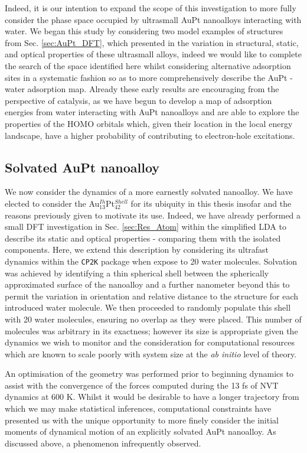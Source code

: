 Indeed, it is our intention to expand the scope of this investigation to more fully consider the phase space occupied by ultrasmall AuPt nanoalloys interacting with water. We began this study by considering two model examples of structures from Sec. \ref{sec:AuPt_DFT}, which presented in \cite{JonesAuPt} the variation in structural, static, and optical properties of these ultrasmall alloys, indeed we would like to complete the search of the space identified here whilst considering alternative adsorption sites in a systematic fashion so as to more comprehensively describe the AuPt - water adsorption map. Already these early results are encouraging from the perspective of catalysis, as we have begun to develop a map of adsorption energies from water interacting with AuPt nanoalloys and are able to explore the properties of the HOMO orbitals which, given their location in the local energy landscape, have a higher probability of contributing to electron-hole excitations.

\subsection{Solvated AuPt nanoalloy}

We now consider the dynamics of a more earnestly solvated nanoalloy. We have elected to consider the Au$_{13}^{Ih}$Pt$_{42}^{Shell}$ for its ubiquity in this thesis insofar and the reasons previously given to motivate its use. Indeed, we have already performed a small DFT investigation in Sec. \ref{sec:Res_Atom} within the simplified LDA to describe its static and optical properties - comparing them with the isolated components. Here, we extend this description by considering its ultrafast dynamics within the \texttt{CP2K} package when expose to 20 water molecules. Solvation was achieved by identifying a thin spherical shell between the spherically approximated surface of the nanoalloy and a further nanometer beyond this to permit the variation in orientation and relative distance to the structure for each introduced water molecule. We then proceeded to randomly populate this shell with 20 water molecules, ensuring no overlap as they were placed. This number of molecules was arbitrary in its exactness; however its size is appropriate given the dynamics we wish to monitor and the consideration for computational resources which are known to scale poorly with system size at the \textit{ab initio} level of theory.

An optimisation of the geometry was performed prior to beginning dynamics to assist with the convergence of the forces computed during the 13 fs of NVT dynamics at 600 K. Whilst it would be desirable to have a longer trajectory from which we may make statistical inferences, computational constraints have presented us with the unique opportunity to more finely consider the initial moments of dynamical motion of an explicitly solvated AuPt nanoalloy. As discussed above, a phenomenon infrequently observed.

